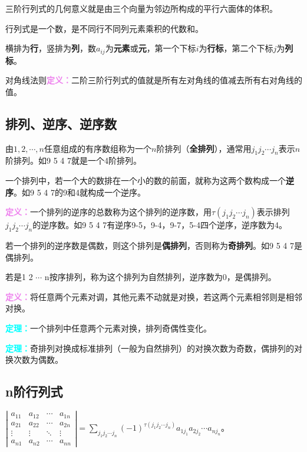 \documentclass[UTF8, 12pt]{ctexart}
\begin{document}
三阶行列式的几何意义就是由三个向量为邻边所构成的平行六面体的体积。

行列式是一个数，是不同行不同列元素乘积的代数和。

横排为\textbf{行}，竖排为\textbf{列}，数$a_{ij}$为\textbf{元素}或\textbf{元}，第一个下标$i$为\textbf{行标}，第二个下标$j$为\textbf{列标}。

对角线法则\textcolor{violet}{\textbf{定义：}}二阶三阶行列式的值就是所有左对角线的值减去所有右对角线的值。

\subsection{排列、逆序、逆序数}

由$1,2,\cdots,n$任意组成的有序数组称为一个$n$阶排列（\textbf{全排列}），通常用$j_1j_2\cdots j_n$表示$n$阶排列。如9 5 4 7就是一个4阶排列。

一个排列中，若一个大的数排在一个小的数的前面，就称为这两个数构成一个\textbf{逆序}。如9 5 4 7的9和4就构成一个逆序。

\textcolor{violet}{\textbf{定义：}}一个排列的逆序的总数称为这个排列的逆序数，用$\tau(j_1j_2\cdots j_n)$表示排列$j_1j_2\cdots j_n$的逆序数。如9 5 4 7有逆序9-5，9-4，9-7，5-4四个逆序，逆序数为4。

若一个排列的逆序数是偶数，则这个排列是\textbf{偶排列}，否则称为\textbf{奇排列}。如9 5 4 7是偶排列。

若是1 2 $\cdots$ n按序排列，称为这个排列为自然排列，逆序数为0，是偶排列。

\textcolor{violet}{\textbf{定义：}}将任意两个元素对调，其他元素不动就是对换，若这两个元素相邻则是相邻对换。

\textcolor{aqua}{\textbf{定理：}}一个排列中任意两个元素对换，排列奇偶性变化。

\textcolor{aqua}{\textbf{定理：}}奇排列对换成标准排列（一般为自然排列）的对换次数为奇数，偶排列的对换次数为偶数。

\subsection{n阶行列式}

$
\left|\begin{array}{cccc} 
    a_{11} & a_{12} & \cdots & a_{1n} \\
    a_{21} & a_{22} & \cdots & a_{2n} \\
    \vdots & \vdots & \ddots & \vdots \\
    a_{n1} & a_{n2} & \cdots & a_{nn}
\end{array}\right| 
=\sum\limits_{j_1j_2\cdots j_n}(-1)^{\tau(j_1j_2\cdots j_n)}a_{1j_1}a_{2j_2}\cdots a_{nj_n}$。
\end{document}

